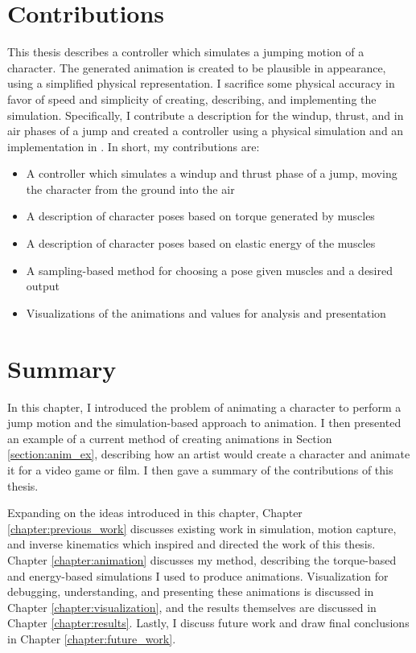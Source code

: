 
\section{Contributions}
\label{section:contributions}
	This thesis describes a controller which simulates a jumping motion of a character.  The generated animation is created to be plausible in appearance, using a simplified physical representation.  I sacrifice some physical accuracy in favor of speed and simplicity of creating, describing, and implementing the simulation.  Specifically, I contribute a description for the windup, thrust, and in air phases of a jump and created a controller using a physical simulation and an implementation in \unity{}.  In short, my contributions are:
	\begin{itemize}
		\item A controller which simulates a windup and thrust phase of a jump, moving the character from the ground into the air
		\item A description of character poses based on torque generated by muscles
		\item A description of character poses based on elastic energy of the muscles
		\item A sampling-based method for choosing a pose given muscles and a desired output
		\item Visualizations of the animations and values for analysis and presentation
	\end{itemize}

\section{Summary}
\label{section:intro_summary}
In this chapter, I introduced the problem of animating a character to perform a jump motion and the simulation-based approach to animation.  I then presented an example of a current method of creating animations in Section \ref{section:anim_ex}, describing how an artist would create a character and animate it for a video game or film.  I then gave a summary of the contributions of this thesis.

Expanding on the ideas introduced in this chapter, Chapter \ref{chapter:previous_work} discusses existing work in simulation, motion capture, and inverse kinematics which inspired and directed the work of this thesis.  Chapter \ref{chapter:animation} discusses my method, describing the torque-based and energy-based simulations I used to produce animations.  Visualization for debugging, understanding, and presenting these animations is discussed in Chapter \ref{chapter:visualization}, and the results themselves are discussed in Chapter \ref{chapter:results}. Lastly, I discuss future work and draw final conclusions in Chapter \ref{chapter:future_work}.